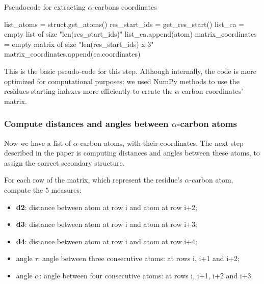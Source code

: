 \begin{algorithm}[ht]
    \caption{Pseudocode for extracting $\alpha$-carbons coordinates}\label{alg:two}
    \begin{algorithmic}
        \STATE list\_atoms = struct.get\_atoms()
        \STATE res\_start\_ids = get\_res\_start()
        \STATE list\_ca = empty list of size "len(res\_start\_ids)"
                \STATE list\_ca.append(atom)
            \ENDIF
        \ENDFOR
        \STATE matrix\_coordinates = empty matrix of size "len(res\_start\_ids) x 3"
            \STATE matrix\_coordinates.append(ca.coordinates)
        \ENDFOR
    \end{algorithmic}
\end{algorithm}

This is the basic pseudo-code for this step. Although internally, the code is more optimized for computational purposes: we used NumPy methods to use the residues starting indexes more efficiently to create the $\alpha$-carbon coordinates' matrix.

\pagebreak

\subsubsection{Compute distances and angles between $\alpha$-carbon atoms}
Now we have a list of $\alpha$-carbon atoms, with their coordinates. The next step described in the paper is computing distances and angles between these atoms, to assign the correct secondary structure.

For each row of the matrix, which represent the residue's $\alpha$-carbon atom, compute the 5 measures:
\begin{itemize}
    \item \textbf{d2}: distance between atom at row i and atom at row i+2;
    \item \textbf{d3}: distance between atom at row i and atom at row i+3;
    \item \textbf{d4}: distance between atom at row i and atom at row i+4;
    \item angle $\tau$: angle between three consecutive atoms: at rows i, i+1 and i+2;
    \item angle $\alpha$: angle between four consecutive atoms: at rows i, i+1, i+2 and i+3.
\end{itemize}

